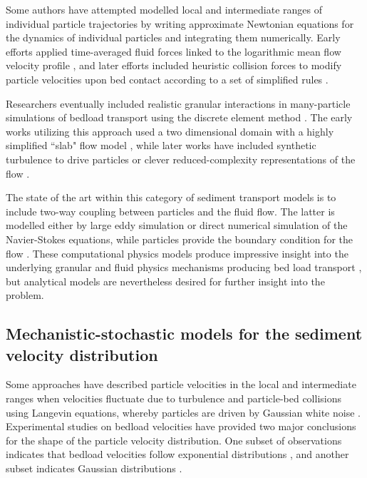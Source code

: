 Some authors have attempted modelled local and intermediate ranges of individual particle trajectories by writing approximate Newtonian equations for the dynamics of individual particles and integrating them numerically. Early efforts applied time-averaged fluid forces linked to the logarithmic mean flow velocity profile \citep{Yalin1963,VanRijn1984}, and later efforts included heuristic collision forces to modify particle velocities upon bed contact according to a set of simplified rules \citep{Wiberg1985,Sekine1992,Nino1998}.

Researchers eventually included realistic granular interactions in many-particle simulations of bedload transport using the discrete element method \citep{Cundall1979a, Haff1993}.
The early works utilizing this approach used a two dimensional domain with a highly simplified ``slab" flow model \citep{Haff1993}, while later works have included synthetic turbulence to drive particles \citep{McEwan2001,Schmeeckle2003,Maurin2015} or clever reduced-complexity representations of the flow \citep{Clark2015,Clark2017}.

The state of the art within this category of sediment transport models is to include two-way coupling between particles and the fluid flow. The latter is modelled either by large eddy simulation or direct numerical simulation of the Navier-Stokes equations, while particles provide the boundary condition for the flow \citep{Schmeeckle2014,Ji2013,Gonzalez2017,Vowinckel2014,Elghannay2017,Yousefi2020}.
These computational physics models produce impressive insight into the underlying granular and fluid physics mechanisms producing bed load transport \citep{Frey2011}, but analytical models are nevertheless desired for further insight into the problem.

\subsection{Mechanistic-stochastic models for the sediment velocity distribution}
\label{sec:langevin}

Some approaches have described particle velocities in the local and intermediate ranges when velocities fluctuate due to turbulence and particle-bed collisions using Langevin equations, whereby particles are driven by Gaussian white noise \citep{Kubo1978}.
Experimental studies on bedload velocities have provided two major conclusions for the shape of the particle velocity distribution. One subset of observations indicates that bedload velocities follow exponential distributions \citep{Lajeunesse2010,Furbish2012,Fathel2015}, and another subset indicates Gaussian distributions \citep{Martin2012,Ancey2014,Heyman2016}.


